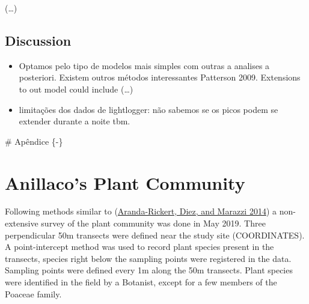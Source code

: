 \documentclass[english,msc,numbers,hidelinks]{coppe}
\providecommand{\tightlist}{%
  \setlength{\itemsep}{0pt}\setlength{\parskip}{0pt}}
\begin{document}
  (\ldots)

  \hypertarget{discussion}{%
  \section{Discussion}\label{discussion}}
  \begin{itemize}
  \tightlist
  \item
    Optamos pelo tipo de modelos mais simples com outras a analises a posteriori. Existem outros métodos interessantes Patterson 2009. Extensions to out model could include (\ldots)
  \item
    limitações dos dados de lightlogger: não sabemos se os picos podem se extender durante a noite tbm.
  \end{itemize}
  \appendix \# Apêndice \{-\}

  \hypertarget{anillacos-plant-community}{%
  \chapter{Anillaco's Plant Community}\label{anillacos-plant-community}}

  Following methods similar to (\protect\hyperlink{ref-aranda-rickert2014}{Aranda-Rickert, Diez, and Marazzi 2014}) a non-extensive survey of the plant community was done in May 2019. Three perpendicular 50m transects were defined near the study site (COORDINATES). A point-intercept method was used to record plant species present in the transects, species right below the sampling points were registered in the data. Sampling points were defined every 1m along the 50m transects. Plant species were identified in the field by a Botanist, except for a few members of the Poaceae family.
\end{document}
